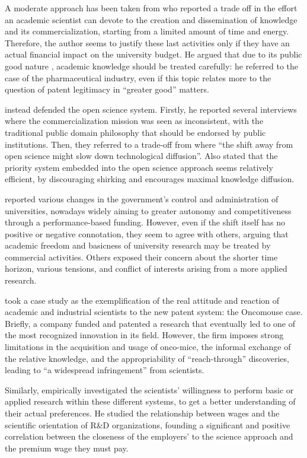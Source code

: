 A moderate approach has been taken from \citet{Beath2000} who reported a trade off in the effort an academic scientist can devote to the creation and dissemination of knowledge and its commercialization, starting from a limited amount of time and energy. Therefore, the author seems to justify these last activities only if they have an actual financial impact on the university budget. He argued that due to its public good nature \citep{Muscio2013}, academic knowledge should be treated carefully: he referred to the case of the pharmaceutical industry, even if this topic relates more to the question of patent legitimacy in \enquote{greater good} matters.

\citet{Siegel2003a} instead defended the open science system. Firstly, he reported several interviews where the commercialization mission was seen as inconsistent, with the traditional public domain philosophy that should be endorsed by public institutions. Then, they referred to a trade-off from \citet{Nelson2001} where \enquote{the shift away from open science might slow down technological diffusion}. Also \citet{Stern2004} stated that the priority system embedded into the open science approach seems relatively efficient, by discouraging shirking and encourages maximal knowledge diffusion.

\citet{Rasmussen2006} reported various changes in the government's control and administration of universities, nowadays widely aiming to greater autonomy and competitiveness through a performance-based funding. However, even if the shift itself has no positive or negative connotation, they seem to agree with others, arguing that academic freedom and basicness of university research may be treated by commercial activities. Others exposed their concern about the shorter time horizon, various tensions, and conflict of interests arising from a more applied research. 

\citet{Murray2005} took a case study as the exemplification of the real attitude and reaction of academic and industrial scientists to the new patent system: the Oncomouse case. Briefly, a company funded and patented a research that eventually led to one of the most recognized innovation in its field. However, the firm imposes strong limitations in the acquisition and usage of onco-mice, the informal exchange of the relative knowledge, and the appropriability of \enquote{reach-through} discoveries, leading to \enquote{a widespread infringement} from scientists. 

Similarly, \citet{Stern2004} empirically investigated the scientists' willingness to perform basic or applied research within these different systems, to get a better understanding of their actual preferences. He studied the relationship between wages and the scientific orientation of R\&D organizations, founding a significant and positive correlation between the closeness of the employers' to the science approach and the premium wage they must pay.

